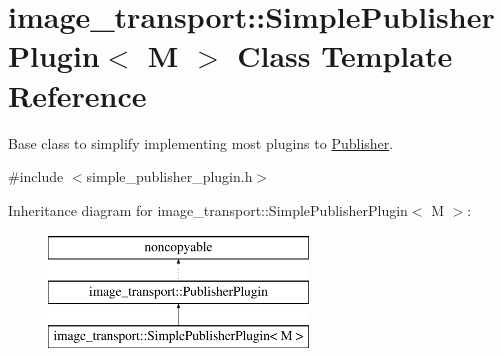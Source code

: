 \hypertarget{classimage__transport_1_1_simple_publisher_plugin}{\section{image\-\_\-transport\-:\-:Simple\-Publisher\-Plugin$<$ M $>$ Class Template Reference}
\label{classimage__transport_1_1_simple_publisher_plugin}
}


Base class to simplify implementing most plugins to \hyperlink{classimage__transport_1_1_publisher}{Publisher}.  




{\ttfamily \#include $<$simple\-\_\-publisher\-\_\-plugin.\-h$>$}

Inheritance diagram for image\-\_\-transport\-:\-:Simple\-Publisher\-Plugin$<$ M $>$\-:\begin{figure}[H]
\begin{center}
\leavevmode
\includegraphics[height=3.000000cm]{classimage__transport_1_1_simple_publisher_plugin}
\end{center}
\end{figure}
